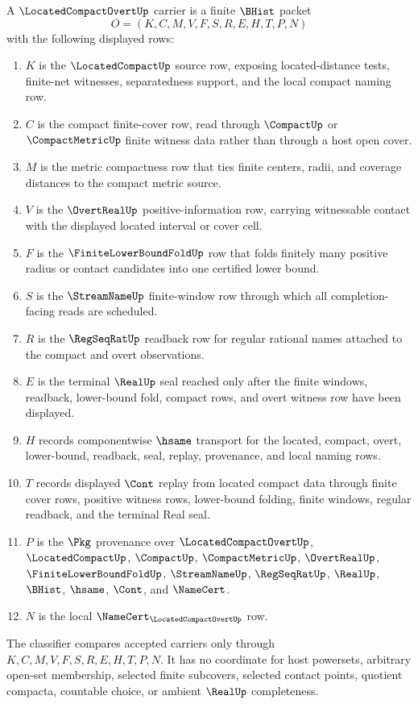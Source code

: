\begin{definition}
\label{def:located-compact-overt-carrier}
A $\LocatedCompactOvertUp$ carrier is a finite $\BHist$ packet
$$
O=(K,C,M,V,F,S,R,E,H,T,P,N)
$$
with the following displayed rows:
\begin{enumerate}
\item $K$ is the $\LocatedCompactUp$ source row, exposing located-distance tests, finite-net witnesses, separatedness support, and the local compact naming row.
\item $C$ is the compact finite-cover row, read through $\CompactUp$ or $\CompactMetricUp$ finite witness data rather than through a host open cover.
\item $M$ is the metric compactness row that ties finite centers, radii, and coverage distances to the compact metric source.
\item $V$ is the $\OvertRealUp$ positive-information row, carrying witnessable contact with the displayed located interval or cover cell.
\item $F$ is the $\FiniteLowerBoundFoldUp$ row that folds finitely many positive radius or contact candidates into one certified lower bound.
\item $S$ is the $\StreamNameUp$ finite-window row through which all completion-facing reads are scheduled.
\item $R$ is the $\RegSeqRatUp$ readback row for regular rational names attached to the compact and overt observations.
\item $E$ is the terminal $\RealUp$ seal reached only after the finite windows, readback, lower-bound fold, compact rows, and overt witness row have been displayed.
\item $H$ records componentwise $\hsame$ transport for the located, compact, overt, lower-bound, readback, seal, replay, provenance, and local naming rows.
\item $T$ records displayed $\Cont$ replay from located compact data through finite cover rows, positive witness rows, lower-bound folding, finite windows, regular readback, and the terminal Real seal.
\item $P$ is the $\Pkg$ provenance over $\LocatedCompactOvertUp$, $\LocatedCompactUp$, $\CompactUp$, $\CompactMetricUp$, $\OvertRealUp$, $\FiniteLowerBoundFoldUp$, $\StreamNameUp$, $\RegSeqRatUp$, $\RealUp$, $\BHist$, $\hsame$, $\Cont$, and $\NameCert$.
\item $N$ is the local $\NameCert_{\LocatedCompactOvertUp}$ row.
\end{enumerate}
The classifier compares accepted carriers only through $K,C,M,V,F,S,R,E,H,T,P,N$. It has no coordinate for host powersets, arbitrary open-set membership, selected finite subcovers, selected contact points, quotient compacta, countable choice, or ambient $\RealUp$ completeness.
\end{definition}

